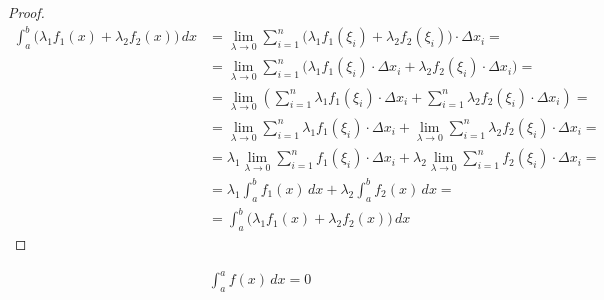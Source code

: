 \begin{proof}
    \begin{align*}
        \int_{a}^{b}\Big(\lambda_1 f_1(x) + \lambda_2 f_2(x)\Big)\, dx &= \lim_{\lambda \to 0} \sum_{i=1}^{n} \Big(\lambda_1 f_1(\xi_i) + \lambda_2 f_2(\xi_i)\Big)\cdot \Delta x_i = \\
        &= \lim_{\lambda \to 0} \sum_{i=1}^{n} \Big(\lambda_1 f_1(\xi_i) \cdot \Delta x_i + \lambda_2 f_2(\xi_i)\cdot \Delta x_i\Big) = \\
        &= \lim_{\lambda \to 0} \left(\sum_{i=1}^{n} \lambda_1 f_1(\xi_i) \cdot \Delta x_i + \sum_{i=1}^{n} \lambda_2 f_2(\xi_i)\cdot \Delta x_i\right) = \\
        &= \lim_{\lambda \to 0} \sum_{i=1}^{n} \lambda_1 f_1(\xi_i) \cdot \Delta x_i + \lim_{\lambda \to 0} \sum_{i=1}^{n} \lambda_2 f_2(\xi_i)\cdot \Delta x_i = \\
        &= \lambda_1 \lim_{\lambda \to 0} \sum_{i=1}^{n} f_1(\xi_i) \cdot \Delta x_i + \lambda_2 \lim_{\lambda \to 0} \sum_{i=1}^{n} f_2(\xi_i)\cdot \Delta x_i = \\
        & = \lambda_1 \int_{a}^{b} f_1(x)\, dx + \lambda_2 \int_{a}^{b} f_2(x)\, dx = \\
        & = \int_{a}^{b}\Big(\lambda_1 f_1(x) + \lambda_2 f_2(x)\Big)\, dx
    \end{align*}
\end{proof}

\newpage
\begin{corollary}
    \begin{gather*}
        \int_{a}^{a} f(x)\, dx = 0
    \end{gather*}
\end{corollary}


